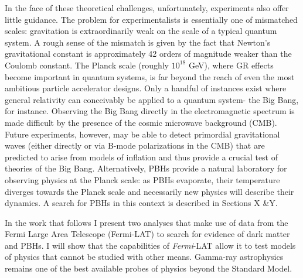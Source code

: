 In the face of these theoretical challenges, unfortunately, experiments also offer little guidance.
The problem for experimentalists is essentially one of mismatched scales: gravitation is extraordinarily weak on the scale of a typical quantum system.
A rough sense of the mismatch is given by the fact that Newton's gravitational constant is approximately 42 orders of magnitude weaker than the Coulomb constant.
The Planck scale (roughly $10^{18}$ GeV), where GR effects become important in quantum systems, is far beyond the reach of even the most ambitious particle accelerator designs.
Only a handful of instances exist where general relativity can conceivably be applied to a quantum system- the Big Bang, for instance.
Observing the Big Bang directly in the electromagnetic spectrum is made difficult by the presence of the cosmic microwave background (CMB).
Future experiments, however, may be able to detect primordial gravitational waves (either directly or via B-mode polarizations in the CMB) that are predicted to arise from models of inflation and thus provide a crucial test of theories of the Big Bang.
Alternatively, PBHs provide a natural laboratory for observing physics at the Planck scale: as PBHs evaporate, their temperature diverges towards the Planck scale and necessarily new physics will describe their dynamics. A search for PBHs in this context is described in Sections X \&Y.

In the work that follows I present two analyses that make use of data from the Fermi Large Area Telescope (Fermi-LAT) to search for evidence of dark matter and PBHs. I will show that the capabilities of {\it{Fermi}}-LAT allow it to test models of physics that cannot be studied with other means. Gamma-ray astrophysics remains one of the best available probes of physics beyond the Standard Model.

